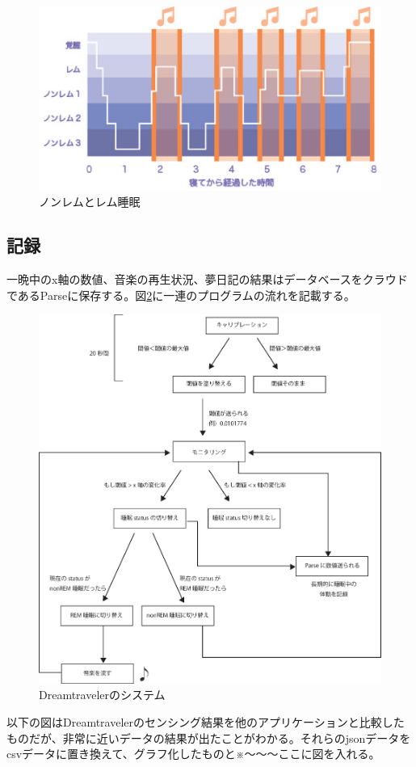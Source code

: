 \begin{figure}[htbp]
\begin{center}
\includegraphics[width=15cm]{eps/remNonrem.eps}
\caption{ノンレムとレム睡眠}
\label{melodyGraph}
\end{center}
\end{figure}


\subsection{記録}
一晩中のx軸の数値、音楽の再生状況、夢日記の結果はデータベースをクラウドであるParseに保存する。図\ref{system}に一連のプログラムの流れを記載する。

\begin{figure}[htbp]
\begin{center}
\includegraphics[width=12cm]{eps/system.eps}
\caption{Dreamtravelerのシステム}
\label{system}
\end{center}
\end{figure}

以下の図はDreamtravelerのセンシング結果を他のアプリケーションと比較したものだが、非常に近いデータの結果が出たことがわかる。それらのjsonデータをcsvデータに置き換えて、グラフ化したものと※〜〜〜ここに図を入れる。

